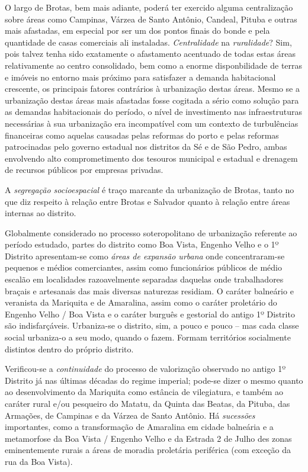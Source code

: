 O largo de Brotas, bem mais adiante, poderá ter exercido alguma centralização sobre áreas como Campinas, Várzea de Santo Antônio, Candeal, Pituba e outras mais afastadas, em especial por ser um dos pontos finais do bonde e pela quantidade de casas comerciais ali instaladas. \textit{Centralidade} na \textit{ruralidade}? Sim, pois talvez tenha sido exatamente o afastamento acentuado de todas estas áreas relativamente ao centro consolidado, bem como a enorme disponbilidade de terras e imóveis no entorno mais próximo para satisfazer a demanda habitacional crescente, os principais fatores contrários à urbanização destas áreas. Mesmo se a urbanização destas áreas mais afastadas fosse cogitada a sério como solução para as demandas habitacionais do período, o nível de investimento nas infraestruturas necessárias à sua urbanização era incompatível com um contexto de turbulências financeiras como aquelas causadas pelas reformas do porto e pelas reformas patrocinadas pelo governo estadual nos distritos da Sé e de São Pedro, ambas envolvendo alto comprometimento dos tesouros municipal e estadual e drenagem de recursos públicos por empresas privadas.

A \textit{segregação socioespacial} é traço marcante da urbanização de Brotas, tanto no que diz respeito à relação entre Brotas e Salvador quanto à relação entre áreas internas ao distrito. 


Globalmente considerado no processo soteropolitano de urbanização referente ao período estudado, partes do distrito como Boa Vista, Engenho Velho e o 1º Distrito apresentam-se como \textit{áreas de expansão urbana} onde concentraram-se pequenos e médios comerciantes, assim como funcionários públicos de médio escalão em localidades razoavelmente separadas daquelas onde trabalhadores braçais e artesanais das mais diversas naturezas residiam. O caráter balneário e veranista da Mariquita e de Amaralina, assim como o caráter proletário do Engenho Velho / Boa Vista e o caráter burguês e gestorial do antigo 1º Distrito são indisfarçáveis. Urbaniza-se o distrito, sim, a pouco e pouco -- mas cada classe social urbaniza-o a seu modo, quando o fazem. Formam territórios socialmente distintos dentro do próprio distrito.

Verificou-se a \textit{continuidade} do processo de valorização observado no antigo 1º Distrito já nas últimas décadas do regime imperial; pode-se dizer o mesmo quanto ao desenvolvimento da Mariquita como estância de vilegiatura, e também ao caráter rural e/ou pesqueiro do Matatu, da Quinta das Beatas, da Pituba, das Armações, de Campinas e da Várzea de Santo Antônio. Há \textit{sucessões} importantes, como a transformação de Amaralina em cidade balneária e a metamorfose da Boa Vista / Engenho Velho e da Estrada 2 de Julho des zonas eminentemente rurais a áreas de moradia proletária periférica (com exceção da rua da Boa Vista).

